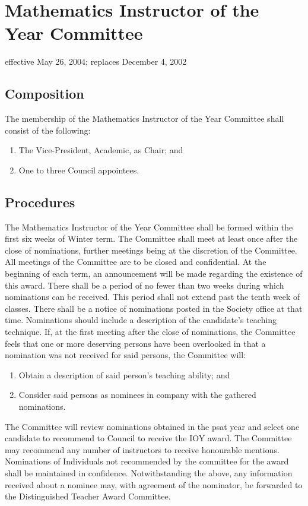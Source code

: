 \section{Mathematics Instructor of the Year Committee}
effective May 26, 2004; replaces December 4, 2002

\subsection{Composition}
The membership of the Mathematics Instructor of the Year Committee shall consist of the following:
\begin{enumerate}
\item The Vice-President, Academic, as Chair; and
\item One to three Council appointees.
\end{enumerate}


\subsection{Procedures}
The Mathematics Instructor of the Year Committee shall be formed within the first six weeks of Winter term. The Committee shall meet at least once after the close of nominations, further meetings being at the discretion of the Committee. All meetings of the Committee are to be closed and confidential.
At the beginning of each term, an announcement will be made regarding the existence of this award.
There shall be a period of no fewer than two weeks during which nominations can be received. This period shall not extend past the tenth week of classes. There shall be a notice of nominations posted in the Society office at that time. Nominations should include a description of the candidate's teaching technique.
If, at the first meeting after the close of nominations, the Committee feels that one or more deserving persons have been overlooked in that a nomination was not received for said persons, the Committee will:
\begin{enumerate}
\item Obtain a description of said person’s teaching ability; and
\item Consider said persons as nominees in company with the gathered nominations.
\end{enumerate}
The Committee will review nominations obtained in the psat year and select one candidate to recommend to Council to receive the IOY award. The Committee may recommend any number of instructors to receive honourable mentions.
Nominations of Individuals not recommended by the committee for the award shall be maintained in confidence.
Notwithstanding the above, any information received about a nominee may, with agreement of the nominator, be forwarded to the Distinguished Teacher Award Committee.

